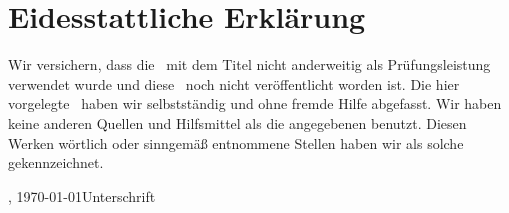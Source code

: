 
\chapter*{Eidesstattliche Erklärung}
\label{sec:EidesstattlicheErklärung}

Wir versichern, dass die \arbeit\ mit dem Titel \glqq{}\titel\grqq{} nicht
anderweitig als Prüfungsleistung verwendet wurde und diese \arbeit\ noch
nicht veröffentlicht worden ist. Die hier vorgelegte \arbeit\ haben wir
selbstständig und ohne fremde Hilfe abgefasst. Wir haben keine anderen Quellen
und Hilfsmittel als die angegebenen benutzt. Diesen Werken wörtlich oder
sinngemäß entnommene Stellen haben wir als solche gekennzeichnet.
\vfill

\begin{center}
\begin{minipage}{0.9\textwidth}
\ort, \today \hfill  Unterschrift
\end{minipage}
\end{center}



